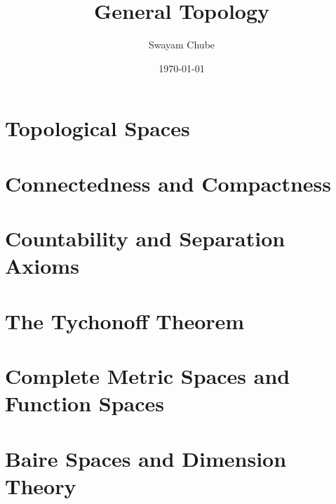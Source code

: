\documentclass[12pt]{report}
\title{General Topology}
\author{Swayam Chube}
\date{\today}
\begin{document}
    \maketitle
    \tableofcontents
    \chapter{Topological Spaces}
    

	\chapter{Connectedness and Compactness}
	

	\chapter{Countability and Separation Axioms}
	

	\chapter{The Tychonoff Theorem}
	

	\chapter{Complete Metric Spaces and Function Spaces}
	

	\chapter{Baire Spaces and Dimension Theory}
	
\end{document}

